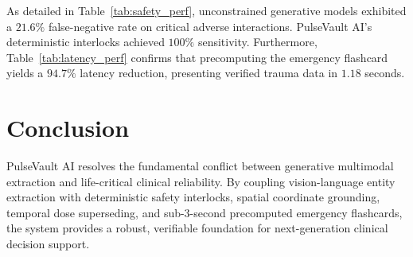 \documentclass[journal]{IEEEtran}
\begin{document}
As detailed in Table~\ref{tab:safety_perf}, unconstrained generative models exhibited a $21.6\%$ false-negative rate on critical adverse interactions. PulseVault AI's deterministic interlocks achieved $100\%$ sensitivity. Furthermore, Table~\ref{tab:latency_perf} confirms that precomputing the emergency flashcard yields a $94.7\%$ latency reduction, presenting verified trauma data in $1.18$ seconds.

\section{Conclusion}
PulseVault AI resolves the fundamental conflict between generative multimodal extraction and life-critical clinical reliability. By coupling vision-language entity extraction with deterministic safety interlocks, spatial coordinate grounding, temporal dose superseding, and sub-3-second precomputed emergency flashcards, the system provides a robust, verifiable foundation for next-generation clinical decision support.



\end{document}
